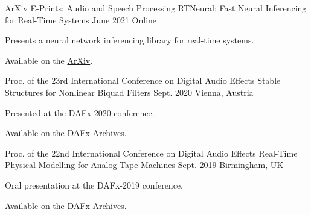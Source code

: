 \begin{cventries}
  \cventry
    {ArXiv E-Prints: Audio and Speech Processing} %
    {RTNeural: Fast Neural Inferencing for Real-Time Systems} %
    {June 2021} %
    {Online} %
    {
      \begin{cvitems} %
        \item {Presents a neural network inferencing library for real-time systems.}
        \item {Available on the \href{https://arxiv.org/pdf/2106.03037.pdf}{ArXiv}.}
      \end{cvitems}
    }

  \cventry
    {Proc. of the 23rd International Conference on Digital Audio Effects} %
    {Stable Structures for Nonlinear Biquad Filters} %
    {Sept. 2020} %
    {Vienna, Austria} %
    {
      \begin{cvitems} %
        \item {Presented at the DAFx-2020 conference.}
        \item {Available on the \href{https://www.dafx.de/paper-archive/2020/proceedings/papers/DAFx2020_paper_3.pdf}{DAFx Archives}.}
      \end{cvitems}
    }

  \cventry
    {Proc. of the 22nd International Conference on Digital Audio Effects} %
    {Real-Time Physical Modelling for Analog Tape Machines} %
    {Sept. 2019} %
    {Birmingham, UK} %
    {
      \begin{cvitems} %
        \item {Oral presentation at the DAFx-2019 conference.}
        \item {Available on the \href{http://www.dafx.de/paper-archive/2019/DAFx2019_paper_3.pdf}{DAFx Archives}.}
      \end{cvitems}
    }



\end{cventries}
